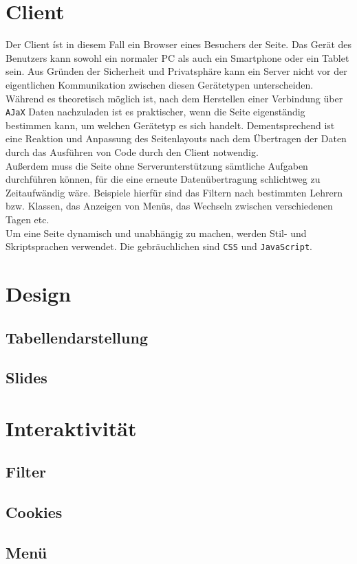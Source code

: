 \section{Client}
Der Client íst in diesem Fall ein Browser eines Besuchers der Seite. Das Gerät des Benutzers kann sowohl ein normaler PC als auch ein Smartphone oder ein Tablet sein. Aus Gründen der Sicherheit und Privatsphäre kann ein Server nicht vor der eigentlichen Kommunikation zwischen diesen Gerätetypen unterscheiden. Während es theoretisch möglich ist, nach dem Herstellen einer Verbindung über \texttt{AJaX} Daten nachzuladen ist es praktischer, wenn die Seite eigenständig bestimmen kann, um welchen Gerätetyp es sich handelt. Dementsprechend ist eine Reaktion und Anpassung des Seitenlayouts nach dem Übertragen der Daten durch das Ausführen von Code durch den Client notwendig.\\

Außerdem muss die Seite ohne Serverunterstützung sämtliche Aufgaben durchführen können, für die eine erneute Datenübertragung schlichtweg zu Zeitaufwändig wäre. Beispiele hierfür sind das Filtern nach bestimmten Lehrern bzw. Klassen, das Anzeigen von Menüs, das Wechseln zwischen verschiedenen Tagen etc.\\

Um eine Seite dynamisch und unabhängig zu machen, werden Stil- und Skriptsprachen verwendet. Die gebräuchlichen sind \texttt{CSS} und \texttt{JavaScript}.

\section{Design}
\subsection{Tabellendarstellung}
%
\subsection{Slides}
%


\section{Interaktivität}
\subsection{Filter}
%
\subsection{Cookies}
%
\subsection{Menü}
%

